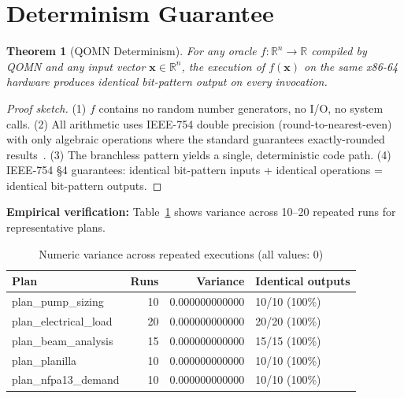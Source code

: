 \documentclass[11pt]{article}
\newtheorem{theorem}{Theorem}
\begin{document}
\section{Determinism Guarantee}

\begin{theorem}[QOMN Determinism]
For any oracle $f: \mathbb{R}^n \to \mathbb{R}$ compiled by QOMN and any
input vector $\mathbf{x} \in \mathbb{R}^n$, the execution of $f(\mathbf{x})$
on the same x86-64 hardware produces identical bit-pattern output on every invocation.
\end{theorem}

\begin{proof}[Proof sketch]
(1) $f$ contains no random number generators, no I/O, no system calls.
(2) All arithmetic uses IEEE-754 double precision (round-to-nearest-even)
    with only algebraic operations where the standard guarantees exactly-rounded results~\cite{ieee754}.
(3) The branchless pattern yields a single, deterministic code path.
(4) IEEE-754 §4 guarantees: identical bit-pattern inputs + identical operations
    = identical bit-pattern outputs.
\end{proof}

\textbf{Empirical verification:} Table~\ref{tab:determinism} shows variance across
10--20 repeated runs for representative plans.

\begin{table}[h]
\centering
\caption{Numeric variance across repeated executions (all values: 0)}
\label{tab:determinism}
\begin{tabular}{lrrl}
\toprule
\textbf{Plan} & \textbf{Runs} & \textbf{Variance} & \textbf{Identical outputs} \\
\midrule
plan\_pump\_sizing       & 10 & 0.000000000000 & 10/10 (100\%) \\
plan\_electrical\_load   & 20 & 0.000000000000 & 20/20 (100\%) \\
plan\_beam\_analysis     & 15 & 0.000000000000 & 15/15 (100\%) \\
plan\_planilla           & 10 & 0.000000000000 & 10/10 (100\%) \\
plan\_nfpa13\_demand     & 10 & 0.000000000000 & 10/10 (100\%) \\
\bottomrule
\end{tabular}
\end{table}
\end{document}
